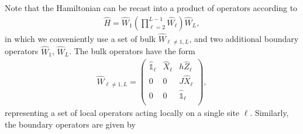 \documentclass{svmono}
\newcommand{\brlr}[1]{\left( #1 \right)}
\providecommand{\DIFaddbegin}{} %
\providecommand{\DIFaddend}{} %
\providecommand{\DIFdelbegin}{} %
\providecommand{\DIFdelend}{} %
\newcommand{\DIFscaledelfig}{0.5}
\newlength{\DIFdelgraphicswidth} %
\newlength{\DIFdelgraphicsheight} %
\newcommand{\DIFaddincludegraphics}[2][]{{\color{blue}\fbox{\DIFOincludegraphics[#1]{#2}}}} %
\newcommand{\DIFdelincludegraphics}[2][]{%
\sbox{\DIFdelgraphicsbox}{\DIFOincludegraphics[#1]{#2}}%
\settoboxwidth{\DIFdelgraphicswidth}{\DIFdelgraphicsbox} %
\settoboxtotalheight{\DIFdelgraphicsheight}{\DIFdelgraphicsbox} %
\scalebox{\DIFscaledelfig}{%
\parbox[b]{\DIFdelgraphicswidth}{\usebox{\DIFdelgraphicsbox}\\[-\baselineskip] \rule{\DIFdelgraphicswidth}{0em}}\llap{\resizebox{\DIFdelgraphicswidth}{\DIFdelgraphicsheight}{%
\setlength{\unitlength}{\DIFdelgraphicswidth}%
\begin{picture}(1,1)%
\thicklines\linethickness{2pt} %
{\color[rgb]{1,0,0}\put(0,0){\framebox(1,1){}}}%
{\color[rgb]{1,0,0}\put(0,0){\line( 1,1){1}}}%
{\color[rgb]{1,0,0}\put(0,1){\line(1,-1){1}}}%
\end{picture}%
}\hspace*{3pt}}} %
} %
\DeclareRobustCommand{\DIFaddbegin}{\DIFOaddbegin \let\includegraphics\DIFaddincludegraphics} %
\DeclareRobustCommand{\DIFaddend}{\DIFOaddend \let\includegraphics\DIFOincludegraphics} %
\DeclareRobustCommand{\DIFdelbegin}{\DIFOdelbegin \let\includegraphics\DIFdelincludegraphics} %
\DeclareRobustCommand{\DIFdelend}{\DIFOaddend \let\includegraphics\DIFOincludegraphics} %
\begin{document}
Note that the Hamiltonian can be recast into a product of operators according to
\begin{align}
    \hat H = \hat W_1\brlr{\prod_{\ell=2}^{L-1}\hat W_{\ell}}\hat W_L,
\end{align}
in which we conveniently use a set of bulk $\hat W_{\ell\neq1,L}$, and two additional boundary operators $\hat W_1$, $\hat W_L$.
The bulk operators have the form
\DIFdelbegin %
\DIFdelend \DIFaddbegin \begin{align}
    \hat W_{\ell\neq1,L} =
    \begin{pmatrix}
        \hat{\mathbb 1}_\ell & \hat X_\ell & h \hat Z_\ell\\
         0 & 0 & J \hat X_\ell\\
        0 & 0 & \hat{\mathbb 1}_\ell\\
    \end{pmatrix},
\end{align}\DIFaddend 
representing a set of local operators acting locally on a single site $\ell$.
Similarly, the boundary operators are given by
\end{document}
